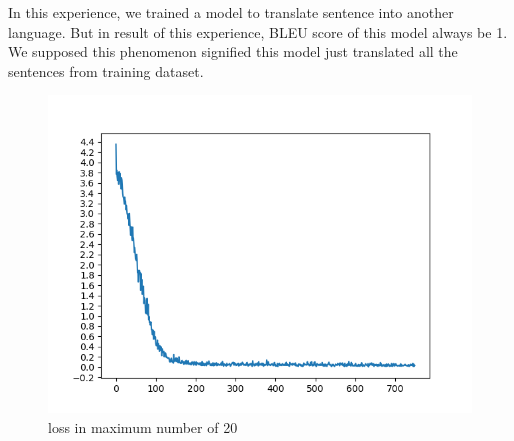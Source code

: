 \documentclass[journal, a4paper]{IEEEtran}
\begin{document}
 In this experience, we trained a model to translate sentence into another language. But in result of this experience, BLEU score of this model always be 1. We supposed this phenomenon signified this model just translated all the sentences from training dataset.

 
	
	\begin{figure}
		\begin{center}
		\includegraphics[width=\columnwidth]{images/loss1.png}
		\caption{loss in maximum number of 20}
		\label{fig:loss1}
		\end{center}
	\end{figure}
	
\end{document}
